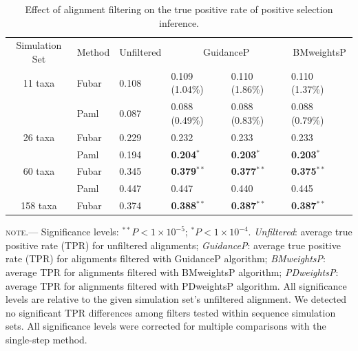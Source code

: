 \documentclass[10pt]{article}
\begin{document}
\begin{table}
\caption {\label{tab:casemodel} Effect of alignment filtering on the true positive rate of positive selection inference.}
\begin{tabular}{c l l l l l }
\hline\noalign{\smallskip}
Simulation Set & Method & Unfiltered & \multicolumn{2}{c}{GuidanceP} & \multicolumn{2}{c}{BMweightsP} & \multicolumn{2}{c}{PDweightsP} \\ 
\noalign{\smallskip}\hline\noalign{\smallskip}
11 taxa  & Fubar & 0.108 & 0.109 (1.04\%)   & 0.110 (1.86\%)  & 0.110 (1.37\%)        \\
              & Paml &  0.087 & 0.088 (0.49\%) &  0.088 (0.83\%)   & 0.088 (0.79\%)        \\
\hline
26 taxa   & Fubar &  0.229 & 0.232       & 0.233 & 0.233         \\
              & Paml & 0.194 &\textbf{0.204}$^{\ast}$ &\textbf{0.203}$^{\ast}$ & \textbf{0.203}$^{\ast}$   \\
\hline
60 taxa  & Fubar & 0.345 & \textbf{0.379}$^{\ast\ast}$ & \textbf{0.377}$^{\ast\ast}$ & \textbf{0.375}$^{\ast\ast}$  \\
              & Paml & 0.447 & 0.447 & 0.440 & 0.445  \\
\hline
158 taxa & Fubar & 0.374 & \textbf{0.388}$^{\ast\ast}$ & \textbf{0.387}$^{\ast\ast}$ & \textbf{0.387}$^{\ast\ast}$  \\
\hline
\end{tabular}
\newline
\textsc{note.}--- Significance levels: $^{\ast\ast} P < 1\times10^{-5}$; $^{\ast} P < 1\times10^{-4}$. \textit{Unfiltered}: average true positive rate (TPR) for unfiltered alignments; \textit{GuidanceP}: average true positive rate (TPR) for alignments filtered with GuidanceP algorithm; \textit{BMweightsP}: average TPR for alignments filtered with BMweightsP algorithm; \textit{PDweightsP}: average TPR for alignments filtered with PDweightsP algorithm. All significance levels are relative to the given simulation set's unfiltered alignment. We detected no significant TPR differences among filters tested within sequence simulation sets. All significance levels were corrected for multiple comparisons with the single-step method.
\end{table}






	
\end{document}

